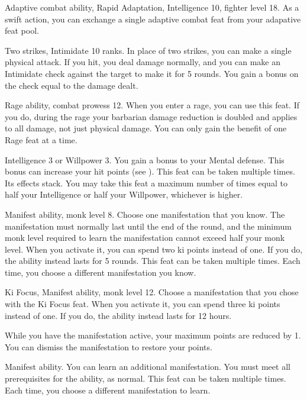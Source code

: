 \featpres Adaptive combat ability, Rapid Adaptation, Intelligence 10, fighter level 18.
\featben As a swift action, you can exchange a single adaptive combat feat from your adapative feat pool.

\featpres Two strikes, Intimidate 10 ranks.
\featben In place of two strikes, you can make a single physical attack.
If you hit, you deal damage normally, and you can make an Intimidate check against the target to make it \shaken for 5 rounds.
You gain a bonus on the check equal to the damage dealt.

\featpres Rage ability, combat prowess 12.
\featben When you enter a rage, you can use this feat. If you do, during the rage your barbarian damage reduction is doubled and applies to all damage, not just physical damage.
 You can only gain the benefit of one Rage feat at a time.

\featpre Intelligence 3 or Willpower 3.
\featben You gain a  bonus to your Mental defense.
This bonus can increase your hit points (see ).
 This feat can be taken multiple times. Its effects stack.
You may take this feat a maximum number of times equal to half your Intelligence or half your Willpower, whichever is higher.

\featpres Manifest \ki ability, monk level 8.
\featben Choose one \ki manifestation that you know.
The manifestation must normally last until the end of the round, and the minimum monk level required to learn the manifestation cannot exceed half your monk level.
When you activate it, you can spend two ki points instead of one.
If you do, the ability instead lasts for 5 rounds.
 This feat can be taken multiple times.
Each time, you choose a different \ki manifestation you know.

\featpres Ki Focus, Manifest \ki ability, monk level 12.
\featben Choose a \ki manifestation that you chose with the Ki Focus feat.
When you activate it, you can spend three ki points instead of one.
If you do, the ability instead lasts for 12 hours.

While you have the manifestation active, your maximum \ki points are reduced by 1.
You can dismiss the manifestation to restore your \ki points.

\featpre Manifest \ki ability.
\featben You can learn an additional \ki manifestation.
You must meet all prerequisites for the ability, as normal.
 This feat can be taken multiple times.
Each time, you choose a different \ki manifestation to learn.

